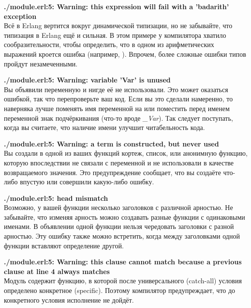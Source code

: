 \blankline
\begin{minipage}{\textwidth}
\textbf{./module.erl:5: Warning: this expression will fail with a 'badarith' exception}\\
Всё в Erlang вертится вокруг динамической типизации, но не забывайте, что типизация в Erlang ещё и сильная.
В этом примере у компилятора хватило сообразительности, чтобы определить, что в одном из арифметических выражений кроется ошибка (например, ).
Впрочем, более сложные ошибки типов пройдут незамеченными.
\end{minipage}

\blankline
\begin{minipage}{\textwidth}
    \textbf{./module.erl:5: Warning: variable 'Var' is unused}\\
    Вы объявили переменную и нигде её не использовали.
    Это может оказаться ошибкой, так что перепроверьте ваш код.
    Если вы это сделали намеренно, то наверняка лучше поменять имя переменной на \ops{\strut{\_}} или поместить перед именем переменной знак подчёркивания (что\--то вроде \emph{\_Var}).
    Так следует поступать, когда вы считаете, что наличие имени улучшит читабельность кода.
\end{minipage}

\blankline
\begin{minipage}{\textwidth}
    \textbf{./module.erl:5: Warning: a term is constructed, but never used}\\
    Вы создали в одной из ваших функций кортеж, список, или анонимную функцию, которую впоследствии не связали с переменной и не использовали в качестве возвращаемого значения.
    Это предупреждение сообщает, что вы создаёте что\--либо впустую или совершили какую\--либо ошибку.
\end{minipage}

\blankline
\begin{minipage}{\textwidth}
    \textbf{./module.erl:5: head mismatch}\\
    Возможно, у вашей функции несколько заголовков с различной арностью.
    Не забывайте, что изменяя арность можно создавать разные функции с одинаковыми именами.
    В объявлении одной функции нельзя чередовать заголовки с разной арностью.
    Эту ошибку также можно встретить, когда между заголовками одной функции вставляют определение другой.
\end{minipage}

\blankline
\begin{minipage}{\textwidth}
    \textbf{./module.erl:5: Warning: this clause cannot match because a previous clause at line 4 always matches}\\
    Модуль содержит функцию, в которой после универсального (catch-all) условия определено конкретное (specific).
    Поэтому компилятор предупреждает, что до конкретного условия исполнение не дойдёт.
\end{minipage}

